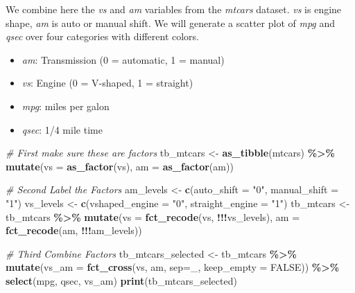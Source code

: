 \documentclass[
]{book}
\newenvironment{Shaded}{\begin{snugshade}}{\end{snugshade}}
\newcommand{\CommentTok}[1]{\textcolor[rgb]{0.56,0.35,0.01}{\textit{#1}}}
\newcommand{\DataTypeTok}[1]{\textcolor[rgb]{0.13,0.29,0.53}{#1}}
\newcommand{\KeywordTok}[1]{\textcolor[rgb]{0.13,0.29,0.53}{\textbf{#1}}}
\newcommand{\NormalTok}[1]{#1}
\newcommand{\OperatorTok}[1]{\textcolor[rgb]{0.81,0.36,0.00}{\textbf{#1}}}
\newcommand{\OtherTok}[1]{\textcolor[rgb]{0.56,0.35,0.01}{#1}}
\newcommand{\StringTok}[1]{\textcolor[rgb]{0.31,0.60,0.02}{#1}}
\providecommand{\tightlist}{%
  \setlength{\itemsep}{0pt}\setlength{\parskip}{0pt}}
\begin{document}
We combine here the \emph{vs} and \emph{am} variables from the \emph{mtcars} dataset. \emph{vs} is engine shape, \emph{am} is auto or manual shift. We will generate a scatter plot of \emph{mpg} and \emph{qsec} over four categories with different colors.

\begin{itemize}
\tightlist
\item
  \emph{am}: Transmission (0 = automatic, 1 = manual)
\item
  \emph{vs}: Engine (0 = V-shaped, 1 = straight)
\item
  \emph{mpg}: miles per galon
\item
  \emph{qsec}: 1/4 mile time
\end{itemize}

\begin{Shaded}
\begin{Highlighting}[]
\CommentTok{\# First make sure these are factors}
\NormalTok{tb\_mtcars \textless{}{-}}\StringTok{ }\KeywordTok{as\_tibble}\NormalTok{(mtcars) }\OperatorTok{\%\textgreater{}\%}\StringTok{ }
\StringTok{  }\KeywordTok{mutate}\NormalTok{(}\DataTypeTok{vs =} \KeywordTok{as\_factor}\NormalTok{(vs), }\DataTypeTok{am =} \KeywordTok{as\_factor}\NormalTok{(am))}

\CommentTok{\# Second Label the Factors}
\NormalTok{am\_levels \textless{}{-}}\StringTok{ }\KeywordTok{c}\NormalTok{(}\DataTypeTok{auto\_shift =} \StringTok{"0"}\NormalTok{, }\DataTypeTok{manual\_shift =} \StringTok{"1"}\NormalTok{)}
\NormalTok{vs\_levels \textless{}{-}}\StringTok{ }\KeywordTok{c}\NormalTok{(}\DataTypeTok{vshaped\_engine =} \StringTok{"0"}\NormalTok{, }\DataTypeTok{straight\_engine =} \StringTok{"1"}\NormalTok{)}
\NormalTok{tb\_mtcars \textless{}{-}}\StringTok{ }\NormalTok{tb\_mtcars }\OperatorTok{\%\textgreater{}\%}\StringTok{ }
\StringTok{  }\KeywordTok{mutate}\NormalTok{(}\DataTypeTok{vs =} \KeywordTok{fct\_recode}\NormalTok{(vs, }\OperatorTok{!!!}\NormalTok{vs\_levels),}
         \DataTypeTok{am =} \KeywordTok{fct\_recode}\NormalTok{(am, }\OperatorTok{!!!}\NormalTok{am\_levels))}

\CommentTok{\# Third Combine Factors}
\NormalTok{tb\_mtcars\_selected \textless{}{-}}\StringTok{ }\NormalTok{tb\_mtcars }\OperatorTok{\%\textgreater{}\%}
\StringTok{  }\KeywordTok{mutate}\NormalTok{(}\DataTypeTok{vs\_am =} \KeywordTok{fct\_cross}\NormalTok{(vs, am, }\DataTypeTok{sep=}\StringTok{\textquotesingle{}\_\textquotesingle{}}\NormalTok{, }\DataTypeTok{keep\_empty =} \OtherTok{FALSE}\NormalTok{)) }\OperatorTok{\%\textgreater{}\%}
\StringTok{  }\KeywordTok{select}\NormalTok{(mpg, qsec, vs\_am)}
\KeywordTok{print}\NormalTok{(tb\_mtcars\_selected)}
\end{Highlighting}
\end{Shaded}
\end{document}
